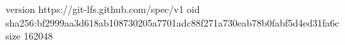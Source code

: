version https://git-lfs.github.com/spec/v1
oid sha256:bf2999aa3d618ab108730205a7701adc88f271a730eab78b0fabf5d4ed31fa6c
size 162048
